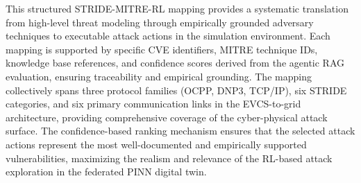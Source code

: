 This structured STRIDE-MITRE-RL mapping provides a systematic translation from high-level threat modeling through empirically grounded adversary techniques to executable attack actions in the simulation environment. Each mapping is supported by specific CVE identifiers, MITRE technique IDs, knowledge base references, and confidence scores derived from the agentic RAG evaluation, ensuring traceability and empirical grounding. The mapping collectively spans three protocol families (OCPP, DNP3, TCP/IP), six STRIDE categories, and six primary communication links in the EVCS-to-grid architecture, providing comprehensive coverage of the cyber-physical attack surface. The confidence-based ranking mechanism ensures that the selected attack actions represent the most well-documented and empirically supported vulnerabilities, maximizing the realism and relevance of the RL-based attack exploration in the federated PINN digital twin.
